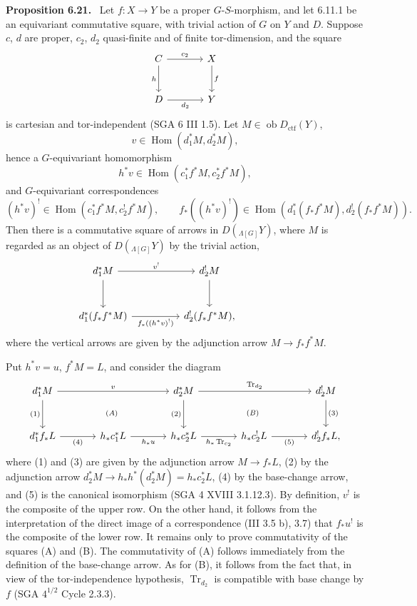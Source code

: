 \documentclass[11pt]{article}
\newenvironment{statement}[1]{\par\medskip\noindent\textbf{#1.}\ }{\par\medskip}
\DeclareMathOperator{\Hom}{Hom}
\providecommand{\Tr}{\operatorname{Tr}}
\providecommand{\Tr}{\operatorname{Tr}}
\providecommand{\Ob}{\operatorname{ob}}
\providecommand{\Tr}{\operatorname{Tr}}
\providecommand{\Hom}{\operatorname{Hom}}
\providecommand{\Ob}{\operatorname{ob}}
\providecommand{\Tr}{\operatorname{Tr}}
\providecommand{\Ob}{\operatorname{Ob}}
\providecommand{\Hom}{\operatorname{Hom}}
\providecommand{\Tr}{\operatorname{Tr}}
\providecommand{\Ob}{\operatorname{ob}}
\providecommand{\Ob}{\operatorname{Ob}}
\begin{document}
\begin{statement}{Proposition 6.21}
Let $f:X\to Y$ be a proper $G$-$S$-morphism, and let 6.11.1 be an equivariant commutative square, with trivial action of $G$ on $Y$ and $D$. Suppose $c$, $d$ are proper, $c_2$, $d_2$ quasi-finite and of finite tor-dimension, and the square
\[
\begin{tikzcd}[column sep=large,row sep=large]
C \arrow[r,"c_2"] \arrow[d,"h"'] & X \arrow[d,"f"]\\
D \arrow[r,"d_2"'] & Y
\end{tikzcd}
\]
is cartesian and tor-independent (SGA 6 III 1.5). Let $M\in\Ob D_{\mathrm{ctf}}(Y)$,
\[
v\in\Hom(d_1^*M,d_2^*M),
\]
hence a $G$-equivariant homomorphism
\[
h^*v\in\Hom(c_1^*f^*M,c_2^*f^*M),
\]
and $G$-equivariant correspondences
\[
(h^*v)^!\in\Hom(c_1^*f^*M,c_2^!f^*M),
\qquad
f_*((h^*v)^!)\in\Hom(d_1^*(f_*f^*M),d_2^!(f_*f^*M)).
\]
Then there is a commutative square of arrows in $D({}_{\Lambda[G]}Y)$, where $M$ is regarded as an object of $D({}_{\Lambda[G]}Y)$ by the trivial action,
\[
\begin{tikzcd}[column sep=huge,row sep=large]
d_1^*M \arrow[r,"v^!"] \arrow[d] & d_2^!M \arrow[d] & {}\\
d_1^*(f_*f^*M) \arrow[r,"f_*((h^*v)^!)"'] & d_2^!(f_*f^*M),
\end{tikzcd}
\]
where the vertical arrows are given by the adjunction arrow $M\to f_*f^*M$.
\end{statement}

Put $h^*v=u$, $f^*M=L$, and consider the diagram
\[
\begin{tikzcd}[column sep=large,row sep=large]
d_1^*M \arrow[rr,"v"] \arrow[d,"{(1)}"'] &&
d_2^*M \arrow[rr,"\Tr_{d_2}"] \arrow[d,"{(2)}"'] &&
d_2^!M \arrow[d,"{(3)}"]\\
d_1^*f_*L \arrow[r,"{(4)}"'] &
h_*c_1^*L \arrow[r,"h_*u"'] &
h_*c_2^*L \arrow[r,"h_*\Tr_{c_2}"'] &
h_*c_2^!L \arrow[r,"{(5)}"'] &
d_2^!f_*L,
\arrow[from=1-1,to=2-3, phantom, "\scriptstyle (A)"]
\arrow[from=1-3,to=2-5, phantom, "\scriptstyle (B)"]
\end{tikzcd}
\]
where (1) and (3) are given by the adjunction arrow $M\to f_*L$, (2) by the adjunction arrow $d_2^*M\to h_*h^*(d_2^*M)=h_*c_2^*L$, (4) by the base-change arrow, and (5) is the canonical isomorphism (SGA 4 XVIII 3.1.12.3). By definition, $v^!$ is the composite of the upper row. On the other hand, it follows from the interpretation of the direct image of a correspondence (III 3.5 b), 3.7) that $f_*u^!$ is the composite of the lower row. It remains only to prove commutativity of the squares (A) and (B). The commutativity of (A) follows immediately from the definition of the base-change arrow. As for (B), it follows from the fact that, in view of the tor-independence hypothesis, $\Tr_{d_2}$ is compatible with base change by $f$ (SGA $4^{1/2}$ Cycle 2.3.3).
\end{document}
